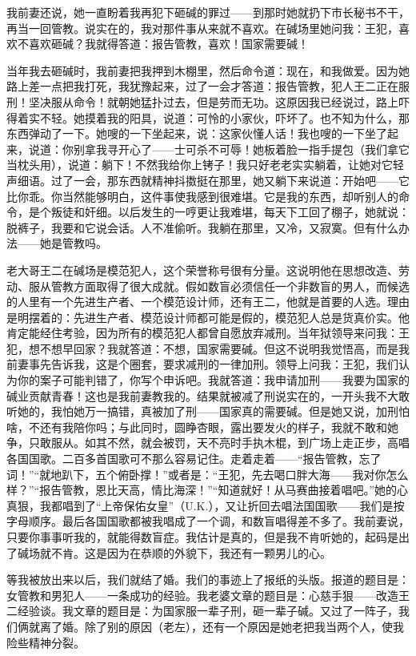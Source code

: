 我前妻还说，她一直盼着我再犯下砸碱的罪过——到那时她就扔下市长秘书不干，再当一回管教。说实在的，我对那件事从来就不喜欢。在碱场里她问我：王犯，喜欢不喜欢砸碱？我就得答道：报告管教，喜欢！国家需要碱！ 

当年我去砸碱时，我前妻把我押到木棚里，然后命令道：现在，和我做爱。因为她路上差一点把我打死，我犹豫起来，过了一会才答道：报告管教，犯人王二正在服刑！坚决服从命令！就朝她猛扑过去，但是劳而无功。这原因我已经说过，路上吓得着实不轻。她摸着我的阳具，说道：可怜的小家伙，吓坏了。也不知为什么，那东西弹动了一下。她嗖的一下坐起来，说：这家伙懂人话！我也嗖的一下坐了起来，说道：你别拿我寻开心了——士可杀不可辱！她板着脸一指手提包（我们拿它当枕头用），说道：躺下！不然我给你上铐子！我只好老老实实躺着，让她对它轻声细语。过了一会，那东西就精神抖擞挺在那里，她又躺下来说道：开始吧——它比你乖。你当然能够明白，这件事使我感到很难堪。它是我的东西，却听别人的命令，是个叛徒和奸细。以后发生的一哼更让我难堪，每天下工回了棚子，她就说：脱裤子，我要和它说会话。人不准偷听。我躺在那里，又冷，又寂寞。但有什么办法——她是管教吗。 

老大哥王二在碱场是模范犯人，这个荣誉称号很有分量。这说明他在思想改造、劳动、服从管教方面取得了很大成就。假如数盲必须信任一个非数盲的男人，而候选的人里有一个先进生产者、一个模范设计师，还有王二，他就是首要的人选。理由是明摆着的：先进生产者、模范设计师都可能是假的，模范犯人总是货真价实。他肯定能经住考验，因为所有的模范犯人都曾自愿放弃减刑。当年狱领导来问我：王犯，想不想早回家？我就答道：不想，国家需要碱。但这不说明我觉悟高，而是我前妻事先告诉我，这是个圈套，要求减刑的一律加刑。领导上问我：王犯，我们认为你的案子可能判错了，你写个申诉吧。我就答道：我申请加刑——我要为国家的碱业贡献青春！这也是我前妻教我的。结果就被减了刑说实在的，一开头我不大敢听她的，我怕她万一搞错，真被加了刑——国家真的需要碱。但是她又说，加刑怕啥，不还有我陪你吗；与此同时，圆睁杏眼，露出要发火的样子，我就不敢和她争，只敢服从。如其不然，就会被罚，天不亮时手执木棍，到广场上走正步，高唱各国国歌。二百多首国歌可不那么容易记住。走着走着——“报告管教，忘了词！”“就地趴下，五个俯卧撑！”或者是：“王犯，先去喝口胖大海——我对你怎么样？”“报告管教，恩比天高，情比海深！”“知道就好！从马赛曲接着唱吧。”她的心真狠，我都唱到了“上帝保佑女皇”（U.K.），又让折回去唱法国国歌——我们是按字母顺序。最后各国国歌都被我唱成了一个调，和数盲唱得差不多了。我前妻说，只要你事事听我的，就能得数盲症。我估计是真的，但是我不肯听她的，起码是出了碱场就不肯。这是因为在恭顺的外貌下，我还有一颗男儿的心。 

等我被放出来以后，我们就结了婚。我们的事迹上了报纸的头版。报道的题目是：女管教和男犯人——一条成功的经验。我老婆文章的题目是：心慈手狠——改造王二经验谈。我文章的题目是：为国家服一辈子刑，砸一辈子碱。又过了一阵子，我们俩就离了婚。除了别的原因（老左），还有一个原因是她老把我当两个人，使我险些精神分裂。 



